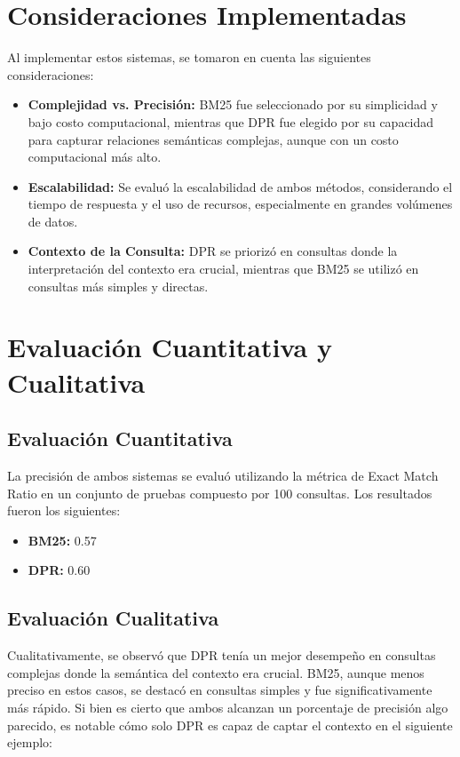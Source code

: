 \documentclass[runningheads]{llncs}
\begin{document}
\section{Consideraciones Implementadas}
Al implementar estos sistemas, se tomaron en cuenta las siguientes consideraciones:
\begin{itemize}
    \item \textbf{Complejidad vs. Precisión:} BM25 fue seleccionado por su simplicidad y bajo costo computacional, mientras que DPR fue elegido por su capacidad para capturar relaciones semánticas complejas, aunque con un costo computacional más alto.
    \item \textbf{Escalabilidad:} Se evaluó la escalabilidad de ambos métodos, considerando el tiempo de respuesta y el uso de recursos, especialmente en grandes volúmenes de datos.
    \item \textbf{Contexto de la Consulta:} DPR se priorizó en consultas donde la interpretación del contexto era crucial, mientras que BM25 se utilizó en consultas más simples y directas.
\end{itemize}

\section{Evaluación Cuantitativa y Cualitativa}
\subsection{Evaluación Cuantitativa}
La precisión de ambos sistemas se evaluó utilizando la métrica de Exact Match Ratio en un conjunto de pruebas compuesto por 100 consultas. Los resultados fueron los siguientes:
\begin{itemize}
    \item \textbf{BM25:} 0.57
    \item \textbf{DPR:} 0.60
\end{itemize}

\subsection{Evaluación Cualitativa}
Cualitativamente, se observó que DPR tenía un mejor desempeño en consultas complejas donde la semántica del contexto era crucial. BM25, aunque menos preciso en estos casos, se destacó en consultas simples y fue significativamente más rápido.
Si bien es cierto que ambos alcanzan un porcentaje de precisión algo parecido, es notable cómo solo DPR es capaz de captar el contexto en el siguiente ejemplo:
\end{document}
